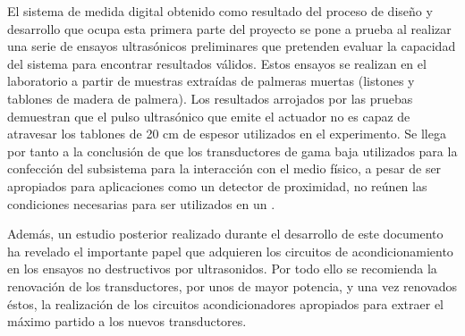 El sistema de medida digital obtenido como resultado del proceso de diseño
y desarrollo que ocupa esta primera parte del proyecto se pone a prueba al
realizar una serie de ensayos ultrasónicos preliminares que pretenden
evaluar la capacidad del sistema para encontrar resultados válidos. Estos
ensayos se realizan en el laboratorio a partir de muestras extraídas de
palmeras muertas (listones y tablones de madera de palmera). Los resultados
arrojados por las pruebas demuestran que el pulso ultrasónico que emite el
actuador no es capaz de atravesar los tablones de 20 cm de espesor
utilizados en el experimento. Se llega por tanto a la conclusión de que los
transductores de gama baja utilizados para la confección del subsistema
para la interacción con el medio físico, a pesar de ser apropiados para
aplicaciones como un detector de proximidad, no reúnen las condiciones
necesarias para ser utilizados en un .

Además, un estudio posterior realizado durante el desarrollo de este
documento ha revelado el importante papel que adquieren los circuitos de
acondicionamiento en los ensayos no destructivos por ultrasonidos. Por todo
ello se recomienda la renovación de los transductores, por unos de mayor
potencia, y una vez renovados éstos, la realización de los circuitos
acondicionadores apropiados para extraer el máximo partido a los nuevos
transductores.
